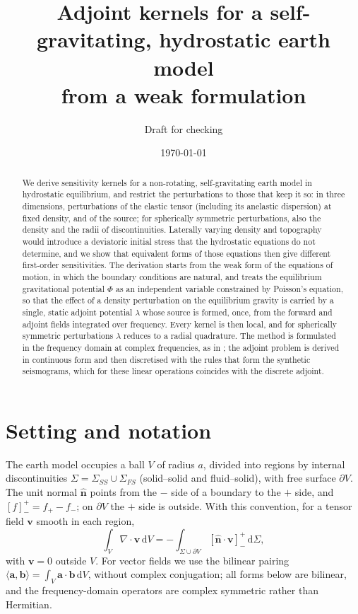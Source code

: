 \documentclass[11pt,a4paper]{article}
\title{Adjoint kernels for a self-gravitating, hydrostatic earth model\\
from a weak formulation}
\author{Draft for checking}
\date{\today}
\newcommand{\bn}{\hat{\mathbf{n}}}
\newcommand{\jump}[1]{\left[#1\right]^+_-}
\newcommand{\dd}{\,\mathrm{d}}
\theoremstyle{remark}
\begin{document}
\maketitle

\begin{abstract}
We derive sensitivity kernels for a non-rotating, self-gravitating earth
model in hydrostatic equilibrium, and restrict the perturbations to those that
keep it so: in three dimensions, perturbations of the elastic tensor
(including its anelastic dispersion) at fixed density, and of the source;
for spherically symmetric perturbations, also the density and the radii of
discontinuities. Laterally varying density and topography would introduce a
deviatoric initial stress that the hydrostatic equations do not determine,
and we show that equivalent forms of those equations then give different
first-order sensitivities. The derivation starts from the weak form of the
equations of motion, in which the boundary conditions are natural, and
treats the equilibrium gravitational potential $\Phi$ as an independent
variable constrained by Poisson's equation, so that the effect of a density
perturbation on the equilibrium gravity is carried by a single, static
adjoint potential $\lambda$ whose source is formed, once, from the forward
and adjoint fields integrated over frequency. Every kernel is then local, and
for spherically symmetric perturbations $\lambda$ reduces to a radial
quadrature. The method is formulated in the frequency domain at complex
frequencies, as in \citet{Adourian2024}; the adjoint problem is derived in
continuous form and then discretised with the rules that form the synthetic
seismograms, which for these linear operations coincides with the discrete
adjoint.
\end{abstract}

\section{Setting and notation}

The earth model occupies a ball $V$ of radius $a$, divided into regions by
internal discontinuities $\Sigma = \Sigma_{SS}\cup\Sigma_{FS}$ (solid--solid
and fluid--solid), with free surface $\partial V$. The unit normal $\bn$
points from the $-$ side of a boundary to the $+$ side, and
$\jump{f} = f_+ - f_-$; on $\partial V$ the $+$ side is outside. With this
convention, for a tensor field $\mathbf{v}$ smooth in each region,
\begin{equation}
  \int_V \nabla\cdot\mathbf{v}\dd V = -\int_{\Sigma\cup\partial V}
  \jump{\bn\cdot\mathbf{v}}\dd\Sigma, \label{eq:gauss}
\end{equation}
with $\mathbf{v}=0$ outside $V$. For vector fields we use the bilinear
pairing $\langle \mathbf{a},\mathbf{b}\rangle = \int_V\mathbf{a}\cdot
\mathbf{b}\dd V$, without complex conjugation; all forms below are bilinear,
and the frequency-domain operators are complex symmetric rather than
Hermitian.
\end{document}
